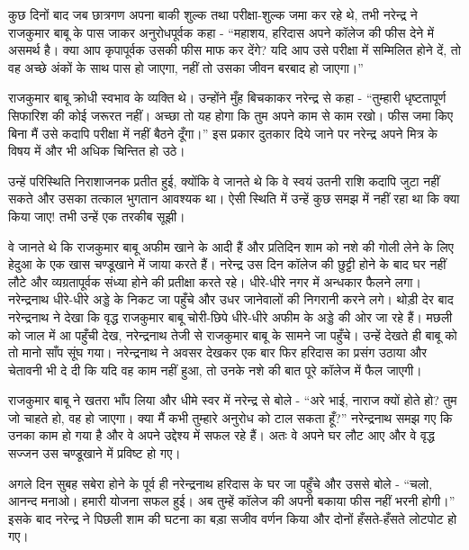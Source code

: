 कुछ दिनों बाद जब छात्रगण अपना बाकी शुल्क तथा परीक्षा-शुल्क जमा कर रहे थे, तभी नरेन्द्र ने राजकुमार बाबू के पास जाकर अनुरोधपूर्वक कहा - “महाशय, हरिदास अपने कॉलेज की फीस देने में असमर्थ है। क्या आप कृपापूर्वक उसकी फीस माफ कर देंगे? यदि आप उसे परीक्षा में सम्मिलित होने दें, तो वह अच्छे अंकों के साथ पास हो जाएगा, नहीं तो उसका जीवन बरबाद हो जाएगा।” 

राजकुमार बाबू क्रोधी स्वभाव के व्यक्ति थे। उन्होंने मुँह बिचकाकर नरेन्द्र से कहा - “तुम्हारी धृष्टतापूर्ण सिफारिश की कोई जरूरत नहीं। अच्छा तो यह होगा कि तुम अपने काम से काम रखो। फीस जमा किए बिना मैं उसे कदापि परीक्षा में नहीं बैठने दूँगा।” इस प्रकार दुतकार दिये जाने पर नरेन्द्र अपने मित्र के विषय में और भी अधिक चिन्तित हो उठे। 

उन्हें परिस्थिति निराशाजनक प्रतीत हुई, क्योंकि वे जानते थे कि वे स्वयं उतनी राशि कदापि जुटा नहीं सकते और उसका तत्काल भुगतान आवश्यक था। ऐसी स्थिति में उन्हें कुछ समझ में नहीं रहा था कि क्या किया जाए! तभी उन्हें एक तरकीब सूझी। 

वे जानते थे कि राजकुमार बाबू अफीम खाने के आदी हैं और प्रतिदिन शाम को नशे की गोली लेने के लिए हेदुआ के एक खास चण्डूखाने में जाया करते हैं। नरेन्द्र उस दिन कॉलेज की छुट्टी होने के बाद घर नहीं लौटे और व्यग्रतापूर्वक संध्या होने की प्रतीक्षा करते रहे। धीरे-धीरे नगर में अन्धकार फैलने लगा। नरेन्द्रनाथ धीरे-धीरे अड्डे के निकट जा पहुँचे और उधर जानेवालों की निगरानी करने लगे। थोड़ी देर बाद नरेन्द्रनाथ ने देखा कि वृद्ध राजकुमार बाबू चोरी-छिपे धीरे-धीरे अफीम के अड्डे की ओर जा रहे हैं। मछली को जाल में आ पहुँची देख, नरेन्द्रनाथ तेजी से राजकुमार बाबू के सामने जा पहुँचे। उन्हें देखते ही बाबू को तो मानो साँप सूंघ गया। नरेन्द्रनाथ ने अवसर देखकर एक बार फिर हरिदास का प्रसंग उठाया और चेतावनी भी दे दी कि यदि वह काम नहीं हुआ, तो उनके नशे की बात पूरे कॉलेज में फैल जाएगी। 

राजकुमार बाबू ने खतरा भाँप लिया और धीमे स्वर में नरेन्द्र से बोले - “अरे भाई, नाराज क्यों होते हो? तुम जो चाहते हो, वह हो जाएगा। क्या मैं कभी तुम्हारे अनुरोध को टाल सकता हूँ?” नरेन्द्रनाथ समझ गए कि उनका काम हो गया है और वे अपने उद्देश्य में सफल रहे हैं। अतः वे अपने घर लौट आए और वे वृद्ध सज्जन उस चण्डूखाने में प्रविष्ट हो गए। 

अगले दिन सुबह सबेरा होने के पूर्व ही नरेन्द्रनाथ हरिदास के घर जा पहुँचे और उससे बोले - “चलो, आनन्द मनाओ। हमारी योजना सफल हुई। अब तुम्हें कॉलेज की अपनी बकाया फीस नहीं भरनी होगी।” इसके बाद नरेन्द्र ने पिछली शाम की घटना का बड़ा सजीव वर्णन किया और दोनों हँसते-हँसते लोटपोट हो गए। 

\vskip -8pt

\delimiter

